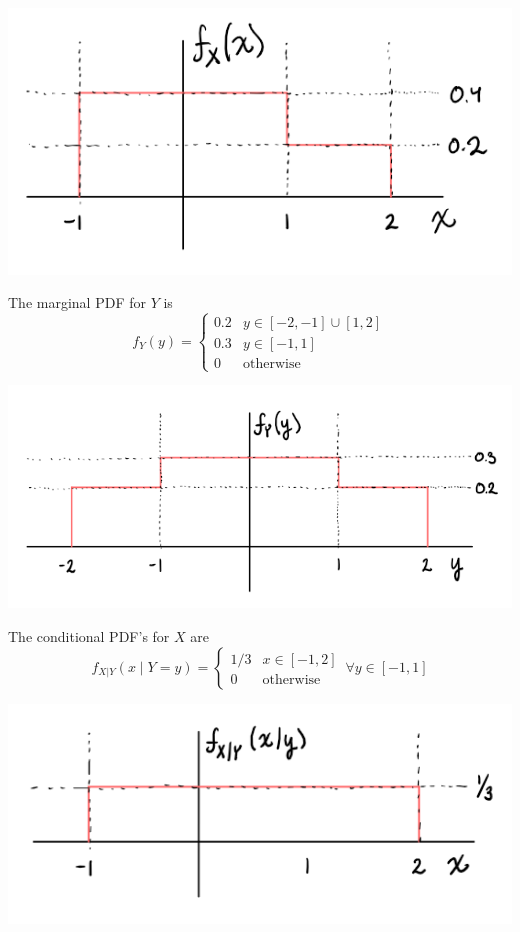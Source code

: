 \documentclass{article}
\begin{document}
\begin{center}
    \includegraphics[scale=1]{Images/P1Ai.PNG}
\end{center}

The marginal PDF for $Y$ is
$$ f_Y(y) = \begin{cases}
    0.2 & y \in [-2, -1] \cup [1, 2] \\
    0.3 & y \in [-1, 1] \\
    0 & \mathrm{otherwise}
\end{cases} $$

\begin{center}
    \includegraphics[scale=1]{Images/P1Aii.PNG}
\end{center}

The conditional PDF's for $X$ are
$$ f_{X|Y}(x \mid Y = y) = \begin{cases}
    1/3 & x \in [-1, 2] \\
    0 & \mathrm{otherwise}
\end{cases}\, \forall y \in [-1, 1]$$

\begin{center}
    \includegraphics[scale=1]{Images/P1Aiii.PNG}
\end{center}
\end{document}

